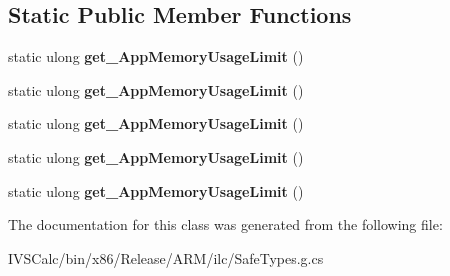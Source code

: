 \subsection*{Static Public Member Functions}
\begin{DoxyCompactItemize}
\item 
\mbox{\label{class_windows_1_1_system_1_1_memory_manager_a62f6be87c1bc7121b03b9c3c6a440571}} 
static ulong {\bfseries get\+\_\+\+App\+Memory\+Usage\+Limit} ()
\item 
\mbox{\label{class_windows_1_1_system_1_1_memory_manager_a62f6be87c1bc7121b03b9c3c6a440571}} 
static ulong {\bfseries get\+\_\+\+App\+Memory\+Usage\+Limit} ()
\item 
\mbox{\label{class_windows_1_1_system_1_1_memory_manager_a62f6be87c1bc7121b03b9c3c6a440571}} 
static ulong {\bfseries get\+\_\+\+App\+Memory\+Usage\+Limit} ()
\item 
\mbox{\label{class_windows_1_1_system_1_1_memory_manager_a62f6be87c1bc7121b03b9c3c6a440571}} 
static ulong {\bfseries get\+\_\+\+App\+Memory\+Usage\+Limit} ()
\item 
\mbox{\label{class_windows_1_1_system_1_1_memory_manager_a62f6be87c1bc7121b03b9c3c6a440571}} 
static ulong {\bfseries get\+\_\+\+App\+Memory\+Usage\+Limit} ()
\end{DoxyCompactItemize}


The documentation for this class was generated from the following file\+:\begin{DoxyCompactItemize}
\item 
I\+V\+S\+Calc/bin/x86/\+Release/\+A\+R\+M/ilc/Safe\+Types.\+g.\+cs\end{DoxyCompactItemize}
